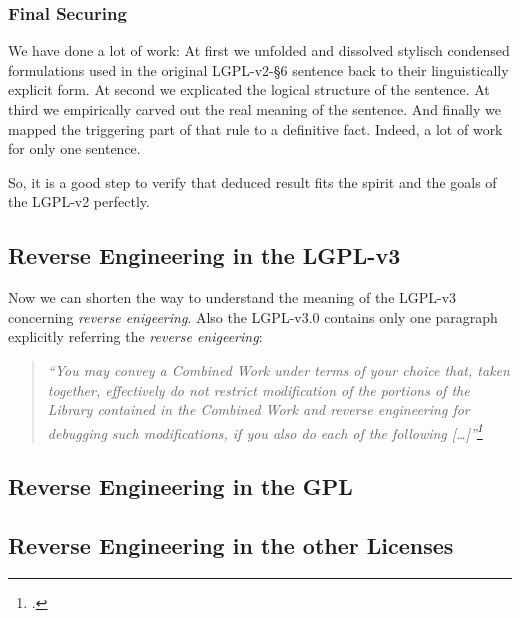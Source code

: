 \subsubsection{Final Securing}

We have done a lot of work: At first we unfolded and dissolved stylisch
condensed formulations used in the original LGPL-v2-§6 sentence back to their
linguistically explicit form. At second we explicated the logical structure of
the sentence. At third we empirically carved out the real meaning of the
sentence. And finally we mapped the triggering part of that rule to a definitive
fact. Indeed, a lot of work for only one sentence.

So, it is a good step to verify that deduced result fits the spirit and the
goals of the LGPL-v2 perfectly.


\subsection{Reverse Engineering in the LGPL-v3}

Now we can shorten the way to understand the meaning of the LGPL-v3 concerning
\emph{reverse enigeering}. Also the LGPL-v3.0 contains only one paragraph
explicitly referring the \emph{reverse enigeering}:


\begin{quote}\emph{
\enquote{You may convey a Combined Work under terms of your choice that,
taken together, effectively \emph{do not restrict} modification of the portions
of the Library contained in the Combined Work and \emph{reverse engineering} for
debugging such modifications, if you also do each of the following
[\ldots]}\footcite[cf.][\nopage wp]{Lgpl30OsiLicense2007a}}
\end{quote}


\subsection{Reverse Engineering in the GPL}

\subsection{Reverse Engineering in the other Licenses}













%
